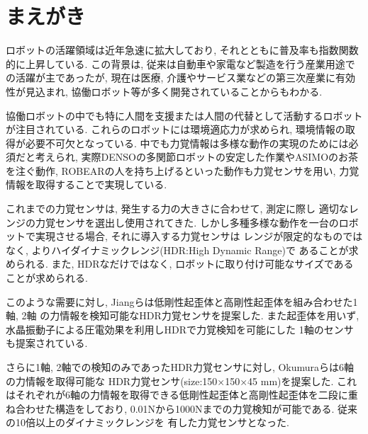 \section{まえがき} 

ロボットの活躍領域は近年急速に拡大しており, 
それとともに普及率も指数関数的に上昇している. 
この背景は, 従来は自動車や家電など製造を行う産業用途での活躍が主であったが, 
現在は医療, 介護やサービス業などの第三次産業に有効性が見込まれ, 
協働ロボット等が多く開発されていることからもわかる.

協働ロボットの中でも特に人間を支援または人間の代替として活動するロボットが注目されている. 
これらのロボットには環境適応力が求められ, 環境情報の取得が必要不可欠となっている.
中でも力覚情報は多様な動作の実現のためには必須だと考えられ, 
実際DENSOの多関節ロボット\cite{denso}の安定した作業やASIMO\cite{asimo}のお茶を注ぐ動作, 
ROBEAR\cite{ROBEAR}の人を持ち上げるといった動作も力覚センサを用い, 
力覚情報を取得することで実現している.

これまでの力覚センサは, 発生する力の大きさに合わせて, 測定に際し
適切なレンジの力覚センサを選出し使用されてきた. 
しかし多種多様な動作を一台のロボットで実現させる場合, それに導入する力覚センサは
レンジが限定的なものではなく, よりハイダイナミックレンジ(HDR:High Dynamic Range)で
あることが求められる. 
また, HDRなだけではなく, ロボットに取り付け可能なサイズであることが求められる. 

このような需要に対し, Jiangらは低剛性起歪体と高剛性起歪体を組み合わせた1軸\cite{Jiang2015}, 2軸\cite{jiang2013}
の力情報を検知可能なHDR力覚センサを提案した. 
また起歪体を用いず, 水晶振動子による圧電効果を利用しHDRで力覚検知を可能にした
1軸のセンサも提案されている\cite{murozaki2014miniaturized}.

さらに1軸, 2軸での検知のみであったHDR力覚センサに対し, Okumuraらは6軸の力情報を取得可能な
HDR力覚センサ(size:150×150×45 mm)を提案した\cite{okumura2018high}. 
これはそれぞれが6軸の力情報を取得できる低剛性起歪体と高剛性起歪体を二段に重ね合わせた構造をしており, 
0.01Nから1000Nまでの力覚検知が可能である. 従来の10倍以上のダイナミックレンジを
有した力覚センサとなった. 


